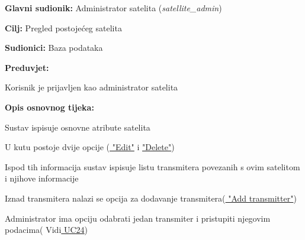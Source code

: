 \noindent {}
\begin{packed_item}
	
	\item \textbf{Glavni sudionik: }Administrator satelita (\textit{satellite\_admin})
	\item  \textbf{Cilj: }Pregled postojećeg satelita
	\item  \textbf{Sudionici: }Baza podataka
	\item  \textbf{Preduvjet: }
	\begin{packed_enum}
		\item Korisnik je prijavljen kao administrator satelita
			\end{packed_enum}
	\item  \textbf{Opis osnovnog tijeka: }
	
	\item[] \begin{packed_enum}
		
		\item Sustav ispisuje osnovne atribute satelita
		\item U kutu postoje dvije opcije (\hyperref[UC22]{ "Edit"} i \hyperref[UC21]{ "Delete"})
		\item Ispod tih informacija sustav ispisuje listu transmitera povezanih s ovim satelitom i njihove informacije
		\item Iznad transmitera nalazi se opcija za dodavanje transmitera(\hyperref[UC12]{ "Add transmitter"})
		\item Administrator ima opciju odabrati jedan transmiter i pristupiti njegovim podacima( Vidi\hyperref[UC24]{ UC24})
		
	\end{packed_enum}
\end{packed_item}
	
				
				
				\newpage
